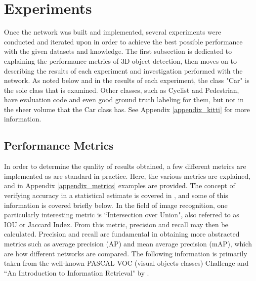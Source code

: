 \newpage
\section{Experiments}
\label{sect_experiments}
Once the network was built and implemented, several experiments were conducted and iterated upon in order to achieve the best possible performance with the given datasets and knowledge. The first subsection is dedicated to explaining the performance metrics of 3D object detection, then moves on to describing the results of each experiment and investigation performed with the network. As noted below and in the results of each experiment, the class "Car" is the sole class that is examined. Other classes, such as Cyclist and Pedestrian, have evaluation code and even good ground truth labeling for them, but not in the sheer volume that the Car class has. See Appendix \ref{appendix_kitti} for more information.


\subsection{Performance Metrics}
In order to determine the quality of results obtained, a few different metrics are implemented as are standard in practice. Here, the various metrics are explained, and in Appendix \ref{appendix_metrics} examples are provided. The concept of verifying accuracy in a statistical estimate is covered in \cite{manning_introduction_2008}, and some of this information is covered briefly below. In the field of image recognition, one particularly interesting metric is ``Intersection over Union", also referred to as IOU or Jaccard Index. From this metric, precision and recall may then be calculated. Precision and recall are fundamental in obtaining more abstracted metrics such as average precision (AP) and mean average precision (mAP), which are how different networks are compared. The following information is primarily taken from the well-known PASCAL VOC (visual objects classes) Challenge \cite{everingham_pascal_2010} and ``An Introduction to Information Retrieval" by \cite{manning_introduction_2008}.

